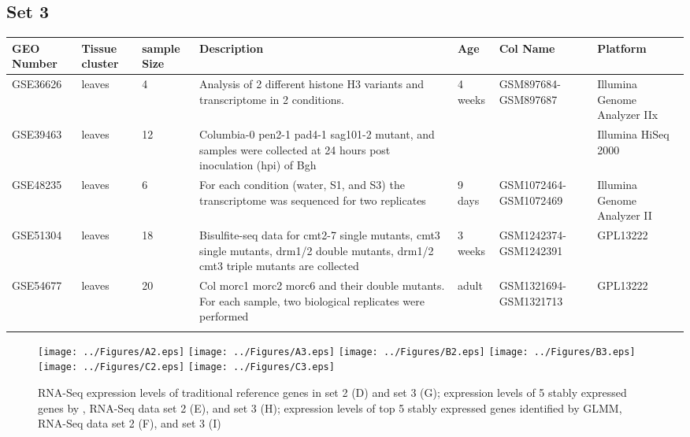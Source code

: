 \documentclass[11pt, a4paper]{article}
\begin{document}
\begin{landscape}
\subsection{Set 3}
\begin{table}
\footnotesize
\centering
\begin{tabular}{p{2cm}p{3cm}p{1cm}p{4cm}p{2.4cm}p{3cm}p{4cm}} \hline
GEO Number &Tissue cluster & sample Size & Description & Age  &Col Name & Platform\\ \hline
GSE36626 &leaves & 4 &Analysis of 2 different histone H3 variants and transcriptome in 2 conditions.  & 4 weeks &GSM897684-GSM897687 & Illumina Genome Analyzer IIx \\ \hdashline
GSE39463 &leaves  &12		&Columbia-0 pen2-1 pad4-1 sag101-2 mutant, and samples were collected at 24 hours post inoculation (hpi) of Bgh & & &Illumina HiSeq 2000 \\ \hdashline
GSE48235 &leaves & 6  & For each condition (water, S1, and S3) the transcriptome was sequenced for two replicates & 9 days & GSM1072464-GSM1072469  &Illumina Genome Analyzer II \\	\hdashline
GSE51304 &leaves  & 18 &Bisulfite-seq data for cmt2-7 single mutants, cmt3 single mutants, drm1/2 double mutants, drm1/2 cmt3 triple mutants are collected  & 3 weeks & GSM1242374-GSM1242391 &GPL13222 \\ \hdashline
GSE54677 & leaves   &20  &Col morc1 morc2 morc6 and their double mutants. For each sample, two biological replicates were performed &adult & GSM1321694-GSM1321713	 &	GPL13222\\ \hdashline
\end{tabular} 
\end{table}
\end{landscape}


 \begin{figure}[H]
\begin{center}
\texttt{[image: ../Figures/A2.eps]}
\texttt{[image: ../Figures/A3.eps]}
\texttt{[image: ../Figures/B2.eps]}
\texttt{[image: ../Figures/B3.eps]}
\texttt{[image: ../Figures/C2.eps]}
\texttt{[image: ../Figures/C3.eps]}
\caption{{\small{\label{sup:expressinlevel} RNA-Seq expression levels of traditional reference genes in set 2 (D) and set 3 (G)}; expression levels of 5 stably expressed genes by \cite{czechowski2005genome}, RNA-Seq data set 2 (E), and set 3 (H); expression levels of top 5 stably expressed genes identified by GLMM, RNA-Seq data set 2 (F), and set 3 (I) }}
\end{center}
\end{figure} 
\end{document}
